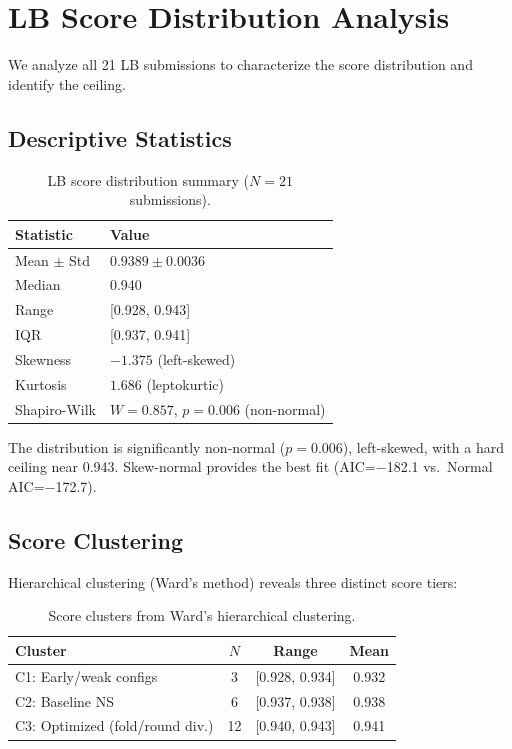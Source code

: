 \documentclass[a4paper,11pt]{article}
\begin{document}
\section{LB Score Distribution Analysis}

We analyze all 21 LB submissions to characterize the score distribution and identify the ceiling.

\subsection{Descriptive Statistics}

\begin{table}[h]
\centering
\caption{LB score distribution summary ($N=21$ submissions).}
\begin{tabular}{ll}
\toprule
Statistic & Value \\
\midrule
Mean $\pm$ Std & $0.9389 \pm 0.0036$ \\
Median & 0.940 \\
Range & [0.928, 0.943] \\
IQR & [0.937, 0.941] \\
Skewness & $-1.375$ (left-skewed) \\
Kurtosis & $1.686$ (leptokurtic) \\
Shapiro-Wilk & $W=0.857$, $p=0.006$ (non-normal) \\
\bottomrule
\end{tabular}
\label{tab:desc}
\end{table}

The distribution is significantly non-normal ($p=0.006$), left-skewed, with a hard ceiling near 0.943.
Skew-normal provides the best fit (AIC=$-$182.1 vs.\ Normal AIC=$-$172.7).

\subsection{Score Clustering}

Hierarchical clustering (Ward's method) reveals three distinct score tiers:

\begin{table}[h]
\centering
\caption{Score clusters from Ward's hierarchical clustering.}
\begin{tabular}{lccc}
\toprule
Cluster & $N$ & Range & Mean \\
\midrule
C1: Early/weak configs & 3 & [0.928, 0.934] & 0.932 \\
C2: Baseline NS & 6 & [0.937, 0.938] & 0.938 \\
C3: Optimized (fold/round div.) & 12 & [0.940, 0.943] & 0.941 \\
\bottomrule
\end{tabular}
\label{tab:clusters}
\end{table}
\end{document}

